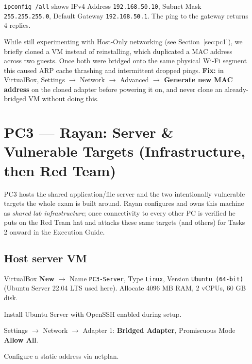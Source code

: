\documentclass[11pt,a4paper]{article}
\begin{document}
\begin{expectbox}
\texttt{ipconfig /all} shows IPv4 Address \texttt{192.168.50.10}, Subnet Mask
\texttt{255.255.255.0}, Default Gateway \texttt{192.168.50.1}. The ping to the gateway
returns 4 replies.
\end{expectbox}

\begin{troublebox}
While still experimenting with Host-Only networking (see Section~\ref{sec:pc1}), we
briefly cloned a VM instead of reinstalling, which duplicated a MAC address across two
guests. Once both were bridged onto the same physical Wi-Fi segment this caused ARP
cache thrashing and intermittent dropped pings. \textbf{Fix:} in VirtualBox, Settings
$\to$ Network $\to$ Advanced $\to$ \textbf{Generate new MAC address} on the cloned
adapter before powering it on, and never clone an already-bridged VM without doing this.
\end{troublebox}

\clearpage

\section{PC3 --- Rayan: Server \& Vulnerable Targets (Infrastructure, then Red Team)}
\label{sec:pc3}

PC3 hosts the shared application/file server and the two intentionally vulnerable
targets the whole exam is built around. Rayan configures and owns this machine as
\emph{shared lab infrastructure}; once connectivity to every other PC is verified he
puts on the Red Team hat and attacks these same targets (and others) for Tasks 2
onward in the Execution Guide.

\subsection{Host server VM}
\begin{steps}
\item VirtualBox \textbf{New} $\to$ Name \texttt{PC3-Server}, Type \texttt{Linux},
  Version \texttt{Ubuntu (64-bit)} (Ubuntu Server 22.04 LTS used here). Allocate
  4096 MB RAM, 2 vCPUs, 60 GB disk.
\item Install Ubuntu Server with OpenSSH enabled during setup.
\item Settings $\to$ Network $\to$ Adapter 1: \textbf{Bridged Adapter}, Promiscuous
  Mode \textbf{Allow All}.
\item Configure a static address via netplan.
\end{steps}
\end{document}
